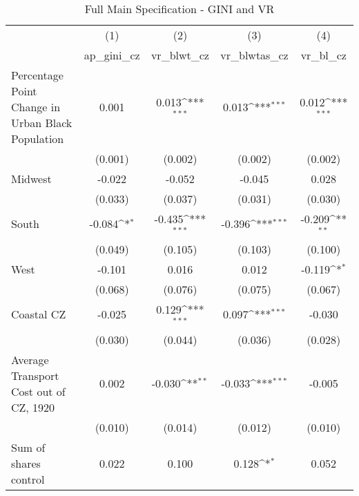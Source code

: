 \begin{table}[htbp]\centering
\def\sym#1{\ifmmode^{#1}\else\(^{#1}\)\fi}
\caption{Full Main Specification - GINI and VR}
\begin{tabular}{l*{4}{c}}
\hline\hline
                    &\multicolumn{1}{c}{(1)}&\multicolumn{1}{c}{(2)}&\multicolumn{1}{c}{(3)}&\multicolumn{1}{c}{(4)}\\
                    &\multicolumn{1}{c}{ap\_gini\_cz}&\multicolumn{1}{c}{vr\_blwt\_cz}&\multicolumn{1}{c}{vr\_blwtas\_cz}&\multicolumn{1}{c}{vr\_bl\_cz}\\
\hline
Percentage Point Change in Urban Black Population&       0.001         &       0.013\sym{***}&       0.013\sym{***}&       0.012\sym{***}\\
                    &     (0.001)         &     (0.002)         &     (0.002)         &     (0.002)         \\
[1em]
Midwest             &      -0.022         &      -0.052         &      -0.045         &       0.028         \\
                    &     (0.033)         &     (0.037)         &     (0.031)         &     (0.030)         \\
[1em]
South               &      -0.084\sym{*}  &      -0.435\sym{***}&      -0.396\sym{***}&      -0.209\sym{**} \\
                    &     (0.049)         &     (0.105)         &     (0.103)         &     (0.100)         \\
[1em]
West                &      -0.101         &       0.016         &       0.012         &      -0.119\sym{*}  \\
                    &     (0.068)         &     (0.076)         &     (0.075)         &     (0.067)         \\
[1em]
Coastal CZ          &      -0.025         &       0.129\sym{***}&       0.097\sym{***}&      -0.030         \\
                    &     (0.030)         &     (0.044)         &     (0.036)         &     (0.028)         \\
[1em]
Average Transport Cost out of CZ, 1920&       0.002         &      -0.030\sym{**} &      -0.033\sym{***}&      -0.005         \\
                    &     (0.010)         &     (0.014)         &     (0.012)         &     (0.010)         \\
[1em]
Sum of shares control&       0.022         &       0.100         &       0.128\sym{*}  &       0.052         \\

\end{tabular}
\end{table}
